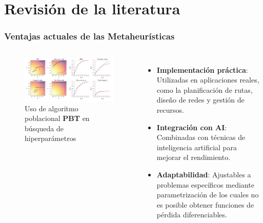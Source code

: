 \section{Revisión de la literatura}

\begin{frame}
  \frametitle{Ventajas actuales de las Metaheurísticas}
  \begin{columns}
    \begin{figure}
      \begin{center}
        \includegraphics[width=\textwidth]{imagenes/chapter3/pbt.png}
      \end{center}
      \caption{Uso de algoritmo poblacional \textbf{PBT} en búsqueda de hiperparámetros \footnotemark[3]}
    \end{figure}
    \begin{itemize}
      \item \textbf{Implementación práctica}: Utilizadas en aplicaciones reales, como la planificación de rutas, diseño de redes y gestión de recursos.
      \item \textbf{Integración con AI}: Combinadas con técnicas de inteligencia artificial para mejorar el rendimiento.
      \item \textbf{Adaptabilidad}: Ajustables a problemas específicos mediante parametrización de los cuales no es posible obtener funciones de pérdida diferenciables.
    \end{itemize}
  \end{columns}
\end{frame}

\note{

}

